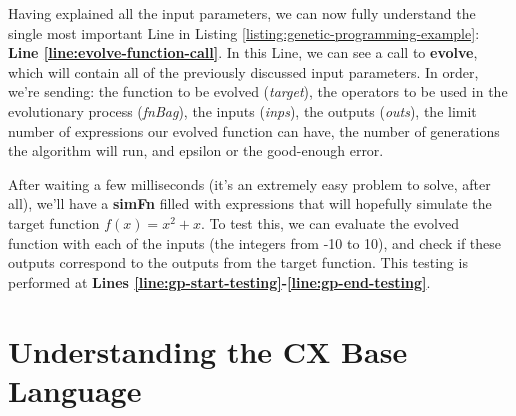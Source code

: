 \documentclass[11pt,fleqn,openany]{book} %
\begin{document}
Having explained all the input parameters, we can now fully understand the single most important Line in Listing \ref{listing:genetic-programming-example}: \textbf{Line \ref{line:evolve-function-call}}. In this Line, we can see a call to \textbf{evolve}, which will contain all of the previously discussed input parameters. In order, we're sending: the function to be evolved (\emph{target}), the operators to be used in the evolutionary process (\emph{fnBag}), the inputs (\emph{inps}), the outputs (\emph{outs}), the limit number of expressions our evolved function can have, the number of generations the algorithm will run, and epsilon or the good-enough error.

After waiting a few milliseconds (it's an extremely easy problem to solve, after all), we'll have a \textbf{simFn} filled with expressions that will hopefully simulate the target function $f(x) = x^2 + x$. To test this, we can evaluate the evolved function with each of the inputs (the integers from -10 to 10), and check if these outputs correspond to the outputs from the target function. This testing is performed at \textbf{Lines \ref{line:gp-start-testing}-\ref{line:gp-end-testing}}.


\chapter{Understanding the CX Base Language}
\label{chapter:creating-your-own-cx}

\end{document}
